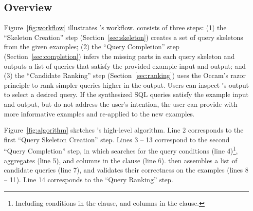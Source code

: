 \subsection{Overview}
\label{sec:algorithm}

\vspace{-1mm}

Figure~\ref{fig:workflow} illustrates \ourtool's workflow.
\ourtool consists of three steps: (1) the ``Skeleton Creation'' step (Section~\ref{sec:skeleton})
creates a set of query skeletons from the given examples;
(2) the ``Query Completion'' step (Section~\ref{sec:completion}) 
infers the missing parts in each query skeleton and outputs
a list of queries that satisfy
the provided example input and output; and (3) the ``Candidate Ranking'' step (Section~\ref{sec:ranking}) uses the Occam's razor
principle to rank simpler queries higher in the output.
Users can inspect \ourtool's output to select a desired query.
If the synthesized SQL queries satisfy the example input and
output, but do not address the user's intention,
the user can provide \ourtool with more informative examples
and re-applied \ourtool to the new examples.


Figure~\ref{fig:algorithm} sketches \ourtool's high-level algorithm.
Line 2 corresponds to the first ``Query Skeleton
Creation'' step. Lines 3 -- 13 correspond to the second ``Query Completion''
step, in which \ourtool searches for the query conditions (line 4)\footnote{
Including conditions in the  clause,
and columns in the  clause.},
aggregates (line 5), and columns in the  clause (line 6).
\ourtool then assembles a list of candidate queries (line 7), and
validates their correctness on the examples (lines 8 -- 11).
Line 14 corresponds to the ``Query Ranking'' step.


